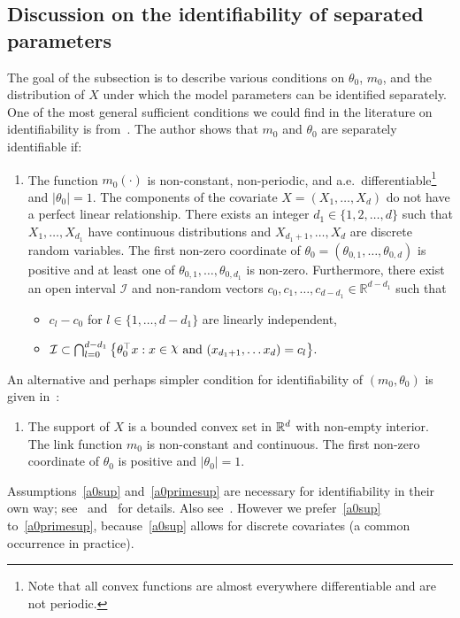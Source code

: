 \subsection{Discussion on the identifiability of separated parameters}\label{sec:IdentDisc}
{ The goal of the subsection is to describe various conditions on $\theta_0$, $m_0$, and the distribution of $X$ under which the model parameters can be identified separately. One of the most general sufficient conditions we could find in the literature on identifiability is from~\citet[Theorem 4.1]{ICHI93}. The author shows that $m_0$ and $\theta_0$ are separately identifiable if:

\begin{enumerate}[label=\bfseries (I)]
\item The function $m_0(\cdot)$ is non-constant, non-periodic, and a.e.~differentiable\footnote{Note that all convex functions are almost everywhere differentiable and are not periodic.} and $|\theta_0|=1$.  The components of the covariate $X =(X_{1}, \ldots, X_{d})$ do not have a perfect linear relationship.  There exists an integer $d_1\in \{1,2,\ldots,d\}$ such that  $X_{1},\ldots, X_{d_1}$ have continuous distributions  and  $X_{ d_1+1},\ldots, X_{d}$ are discrete random variables. The first non-zero coordinate of $\theta_0= (\theta_{0,1},\ldots, \theta_{0,d})$ is positive and at least one of  $\theta_{0,1}, \ldots, \theta_{0,d_1}$ is non-zero.  Furthermore, there exist an open interval $\mathcal{I}$ and non-random vectors  $c_0,c_1,\ldots, c_{d-d_1} \in \mathbb{R}^{d-d_1}$ such that \label{a0sup}
\begin{itemize}
\item $c_l-c_0$ for $l\in \{1 ,\ldots, d-d_1\}$ are linearly independent,
\item $\mathcal{I} \subset \bigcap_{l=0}^{d-d_1} \big\{ \theta_0^\top x:  x\in \rchi \text{ and } (x_{d_1+1}, \ldots x_d) =c_l \big\}.$
\end{itemize}
\end{enumerate}
 An alternative and perhaps simpler  condition for identifiability of $(m_0,\theta_0)$ is given in~\citet[Theorem 1]{LinKul07}:
\begin{enumerate}[label=\bfseries (I$'$)]
\item The support of $X$ is a bounded convex set in $\mathbb{R}^d$ with non-empty interior. The link function  $m_0$ is non-constant and continuous. The first non-zero coordinate of $\theta_0$ is positive and $|\theta_0|=1$.\label{a0primesup}
\end{enumerate}
Assumptions~\ref{a0sup} and~\ref{a0primesup} are necessary for identifiability in their own way; see~\cite{liracine07} and~\cite{LinKul07} for details. Also see~\cite{yuan2011identifiability}. However we prefer~\ref{a0sup} to~\ref{a0primesup}, because~\ref{a0sup} allows for discrete covariates (a common occurrence in practice).}



